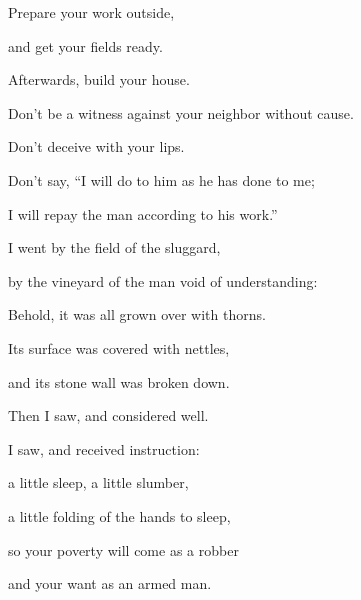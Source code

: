 {\par }{\Q {}Prepare your work outside,
\par }{\QB and get your fields ready.
\par }{\QB Afterwards, build your house.
\par }{\Q {}Don’t be a witness against your neighbor without cause.
\par }{\QB Don’t deceive with your lips.
\par }{\Q {}Don’t say, “I will do to him as he has done to me;
\par }{\QB I will repay the man according to his work.”
\par }{\Q {}I went by the field of the sluggard,
\par }{\QB by the vineyard of the man void of understanding:
\par }{\Q {}Behold, it was all grown over with thorns.
\par }{\QB Its surface was covered with nettles,
\par }{\QB and its stone wall was broken down.
\par }{\Q {}Then I saw, and considered well.
\par }{\QB I saw, and received instruction:
\par }{\Q {}a little sleep, a little slumber,
\par }{\QB a little folding of the hands to sleep,
\par }{\Q {}so your poverty will come as a robber
\par }{\QB and your want as an armed man.

}
